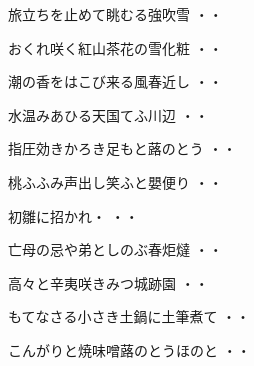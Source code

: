 \vspace{0.6cm}
\begin{shiika}旅立ちを止めて眺むる強吹雪
\hfill{・・}\end{shiika}
\vspace{0.6cm}
\begin{shiika}おくれ咲く紅山茶花の雪化粧
\hfill{・・}\end{shiika}
\vspace{0.6cm}
\begin{shiika}潮の香をはこび来る風春近し
\hfill{・・}\end{shiika}
\vspace{0.6cm}
\begin{shiika}水温みあひる天国てふ川辺
\hfill{・・}\end{shiika}
\vspace{0.6cm}
\begin{shiika}指圧効きかろき足もと蕗のとう
\hfill{・・}\end{shiika}
\vspace{0.6cm}
\begin{shiika}桃ふふみ声出し笑ふと嬰便り
\hfill{・・}\end{shiika}
\vspace{0.6cm}
\begin{shiika}初雛に招かれ・
\hfill{・・}\end{shiika}
\vspace{0.6cm}
\begin{shiika}亡母の忌や弟としのぶ春炬燵
\hfill{・・}\end{shiika}
\vspace{0.6cm}
\begin{shiika}高々と辛夷咲きみつ城跡園
\hfill{・・}\end{shiika}
\vspace{0.6cm}
\begin{shiika}もてなさる小さき土鍋に土筆煮て
\hfill{・・}\end{shiika}
\vspace{0.6cm}
\begin{shiika}こんがりと焼味噌蕗のとうほのと
\hfill{・・}\end{shiika}
